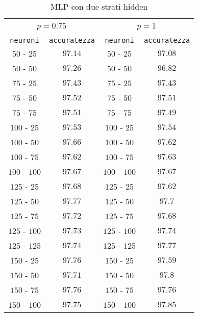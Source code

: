 \vspace*{\fill}
\begin{center}

\begin{table}[]
  \small
  \caption{MLP con due strati hidden}\label{tab:modselmnist2}
\begin{center}
\begin{tabular}{@{}cc|cc@{}}

\hline\\[-11pt]
\hline\\[-6.5pt]
\multicolumn{2}{c}{\bf $p=0.75$} & \multicolumn{2}{c}{\bf $p=1$ } \\[5pt]
\hline\\[-11pt]
\texttt{neuroni} & \texttt{accuratezza} & \texttt{neuroni} & \texttt{accuratezza} \\[1pt]
$50$ - $25$ & $97.14$ & $50$ - $25$ & $97.08$ \\ [1pt]
$50$ - $50$ & $97.26$ & $50$ - $50$ & $96.82$ \\ [1pt]
$75$ - $25$ & $97.43$ & $75$ - $25$ & $97.43$ \\ [1pt]
$75$ - $50$ & $97.52$ & $75$ - $50$ & $97.51$ \\ [1pt]
$75$ - $75$ & $97.51$ & $75$ - $75$ & $97.49$ \\ [1pt]
$100$ - $25$ & $97.53$  &  $100$ - $25$ & $97.54$ \\ [1pt]
$100$ - $50$ & $97.66$  &  $100$ - $50$ & $97.62$ \\ [1pt]
$100$ - $75$ & $97.62$  &  $100$ - $75$ & $97.63$ \\ [1pt]
$100$ - $100$ & $97.67$  & $100$ - $100$ & $97.67$ \\ [1pt]
$125$ - $25$ & $97.68$  &  $125$ - $25$ & $97.62$ \\ [1pt]
$125$ - $50$ & $97.77$ &  $125$ - $50$ & $97.7$ \\ [1pt]
$125$ - $75$ & $97.72$  &  $125$ - $75$ & $97.68$ \\ [1pt]
$125$ - $100$ & $97.73$  & $125$ - $100$ & $97.74$ \\ [1pt]
$125$ - $125$ & $97.74$  & $125$ - $125$ & $97.77$ \\ [1pt]
$150$ - $25$ & $97.76$  &  $150$ - $25$ & $97.59$ \\ [1pt]
$150$ - $50$ & $97.71$ &  $150$ - $50$ & $97.8$ \\ [1pt]
$150$ - $75$ & $97.76$  &  $150$ - $75$ & $97.76$ \\ [1pt]
$150$ - $100$ & $97.75$  & $150$ - $100$ & $97.85$ \\ [1pt]

\end{tabular}
\end{center}
\end{table}
\end{center}

